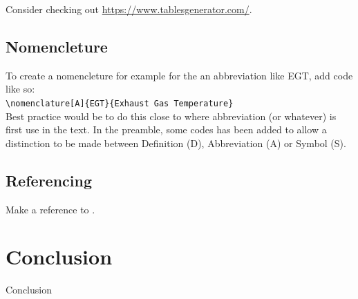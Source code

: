 \documentclass[11pt,a4paper,twoside]{article}
\begin{document}
Consider checking out \url{https://www.tablesgenerator.com/}.

\subsection{Nomencleture}
To create a nomencleture for example for the an abbreviation like EGT, add code like so:\\
\verb=\nomenclature[A]{EGT}{Exhaust Gas Temperature}= \\
Best practice would be to do this close to where abbreviation (or whatever) is first use in the text.
In the preamble, some codes has been added to allow a distinction to be made between Definition (D), Abbreviation (A) or Symbol (S).


\subsection{Referencing}
Make a reference to \citep{NormanS.Nise2012}.

\section{Conclusion}
Conclusion

\newpage
\printbibliography[heading=bibintoc]

\newpage
\printnomenclature
\end{document}
